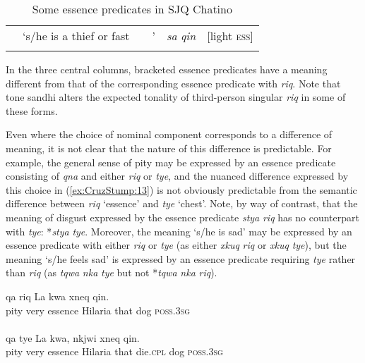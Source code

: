 \documentclass[output=paper]{langsci/langscibook}
\begin{document}
\begin{table}[t]
\begin{tabularx}{\textwidth}{l@{~} Q l@{}l@{}l l@{}}
&`s/he is a thief or fast &&'&\emph{sa} \emph{qin}&[light \textsc{ess}]  \\
\lspbottomrule
\end{tabularx}
 \caption{Some essence predicates in SJQ Chatino}
\parbox{\textwidth}{\footnotesize In the three central columns, bracketed essence predicates have a meaning different from that of the corresponding essence predicate with  \emph{riq}. Note that tone sandhi alters the expected tonality of third-person singular \emph{riq} in some of these forms.}
\label{tab:CruzStump:sjq-16}
\end{table}

Even where the choice of nominal component corresponds to a difference of meaning, it is not clear that the nature of this difference is predictable.
For example, the general sense of pity may be expressed by an essence predicate consisting of \emph{qna} and
either \emph{riq} or \emph{tye}, and the nuanced difference expressed by this choice in (\ref{ex:CruzStump:13}) is not obviously predictable from the semantic difference between \emph{riq} `essence' and \emph{tye} `chest'.  Note, by way of contrast, that the meaning of disgust expressed by the essence predicate \emph{stya} \emph{riq} has no counterpart with \emph{tye}: *\emph{stya} \emph{tye}. Moreover, the
meaning `s/he is sad' may be expressed by an essence predicate with either \emph{riq} or \emph{tye} (as
either \emph{xkuq} \emph{riq} or \emph{xkuq} \emph{tye}), but the meaning `s/he feels sad' is expressed by an essence predicate requiring
\emph{tye} rather than \emph{riq} (as \emph{tqwa} \emph{nka} \emph{tye} but not *\emph{tqwa} \emph{nka} \emph{riq}). 

\begin{exe}
	\ex\label{ex:CruzStump:13}
		\ea {} {{qa} } {{riq} } {{La} } {{kwa} } {{xneq} } {{qin}. } {}\\
	 { {pity}} {very} {essence} {Hilaria} {that} {dog} {\textsc{poss.3sg} } {}\\
	\\

	 \ex {} {{qa} } {{tye} } {{La} } {{kwa}, } {{nkjwi} } {{xneq} } {{qin}.}\\
	  { {pity}} {very} {essence} {Hilaria} {that} {die.\textsc{cpl}} {dog} {\textsc{poss.3sg}}\\
	\\
	\z
\end{exe}
\end{document}

